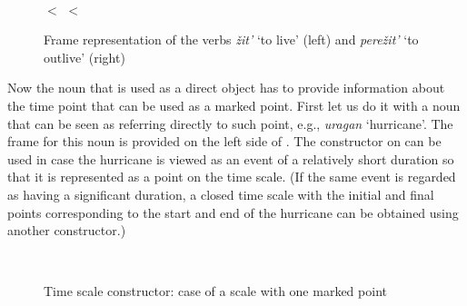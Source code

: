\begin{figure}
\begin{minipage}{0.3\textwidth}
\end{minipage}\hfill%
\begin{minipage}{0.55\textwidth}\centering
{}\\
 $<$  $<$ 
\end{minipage}
\caption{Frame representation of the verbs \textit{\v{z}it'} `to live' (left) and \textit{pere\v{z}it'} `to outlive' (right) \label{frame:live}}
\end{figure}

Now the noun that is used as a direct object has to provide information about the time point that can be used as a marked point. First let us do it with a noun that can be seen as referring directly to such point, e.g., \textit{uragan} `hurricane'. The frame for this noun is provided on the left side of . The constructor on  can be used in case the hurricane is viewed as an event of a relatively short duration so that it is represented as a point on the time scale. (If the same event is regarded as having a significant duration, a closed time scale with the initial and final points corresponding to the start and end of the hurricane can be obtained using another constructor.) 

\begin{figure}
\begin{minipage}{0.65\textwidth}
\\
\end{minipage}%
\begin{minipage}{0.35\textwidth}
\end{minipage}
\caption{Time scale constructor: case of a scale with one marked point \label{constructor:time}}
\end{figure}

